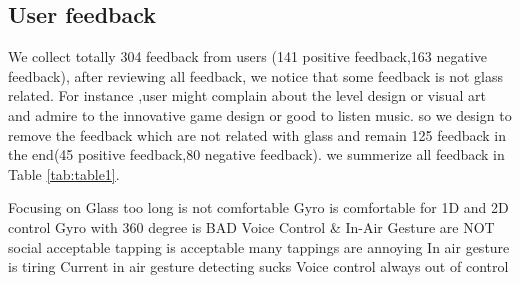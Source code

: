 \subsection{User feedback}
We collect totally 304 feedback from users (141 positive feedback,163 negative feedback), after reviewing all feedback, we notice that some feedback is not glass related. For instance ,user might complain about the level design or visual art and admire to the innovative game design or good to listen music. so we design to remove the feedback which are not related with glass and remain 125 feedback in the end(45 positive feedback,80 negative feedback). we summerize all feedback in Table \ref{tab:table1}.

Focusing on Glass too long is not comfortable
Gyro is comfortable for 1D and 2D control
Gyro with 360 degree is BAD
Voice Control \& In-Air Gesture are NOT social acceptable
tapping is acceptable many tappings are annoying
In air gesture is tiring
Current in air gesture detecting sucks
Voice control always out of control




